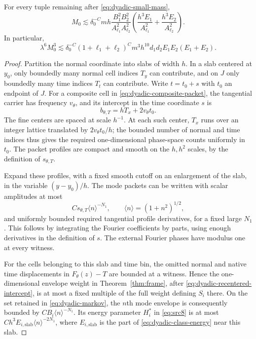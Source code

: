 \begin{lemma}\label{lem:dyadic-tuple}
For every tuple remaining after \eqref{eq:dyadic-small-mass},
\begin{equation}\label{eq:dyadic-frame-substitution}
 M_0\lesssim \delta_0^{-C}mh
 \frac{B_1^2B_2^2}{A_{\ell_1}^2A_{\ell_2}^2}
 \left(\frac{h^3E_1}{A_{\ell_1}^2}
            +\frac{h^3E_2}{A_{\ell_2}^2}\right).
\end{equation}
In particular,
\begin{equation}\label{eq:dyadic-cubic-mass}
 \lambda^6M_0^3\lesssim
 \delta_0^{-C}(1+\ell_1+\ell_2)^C
 m^3h^{10}d_1d_2E_1E_2(E_1+E_2).
\end{equation}
\end{lemma}
\begin{proof}
Partition the normal coordinate into slabs of width $h$.  In a slab
centered at $y_0$, only boundedly many normal cell indices $T_y$ can
contribute, and on $J$ only boundedly many time indices $T_t$ can
contribute.  Write $t=t_0+s$ with $t_0$ an endpoint of $J$.
For a composite cell in \eqref{eq:dyadic-composite-packet}, the
tangential carrier has frequency $v_\theta$, and its intercept in the
time coordinate $s$ is
\begin{equation}\label{eq:dyadic-recentered-intercept}
 b_{\theta,T}=hT_x+2v_\theta t_0.
\end{equation}
The fine centers are spaced at scale $h^{-1}$.  At each such center,
$T_x$ runs over an integer lattice translated by $2v_\theta t_0/h$;
the bounded number of normal and time indices thus gives the required
one-dimensional phase-space counts uniformly in $t_0$.  The packet
profiles are compact and smooth on the $h,h^2$ scales, by the definition
of $s_{\theta,T}$.

Expand these profiles, with a fixed smooth cutoff on an enlargement of
the slab, in the variable $(y-y_0)/h$.  The mode packets can be written
with scalar amplitudes at most
\[
 C s_{\theta,T}\langle n\rangle^{-N_1},
 \qquad \langle n\rangle=(1+n^2)^{1/2},
\]
and uniformly bounded required tangential profile derivatives, for a
fixed large $N_1$.  This follows by integrating the Fourier coefficients
by parts, using enough derivatives in the definition of $s$.  The
external Fourier phases have modulus one at every witness.

For the cells belonging to this slab and time bin, the omitted normal
and native time displacements in $F_\theta(z)-T$ are bounded at a
witness.  Hence the one-dimensional envelope weight in
Theorem~\ref{thm:frame}, after \eqref{eq:dyadic-recentered-intercept},
is at most a fixed multiple of the full weight defining $S_i$ there.
On the set retained in \eqref{eq:dyadic-markov}, the $n$th mode
envelope is consequently bounded by
$CB_i\langle n\rangle^{-N_1}$.  Its energy parameter $H_i^*$ in
\eqref{eq:src8} is at most
$Ch^3E_{i,\mathrm{slab}}\langle n\rangle^{-2N_1}$, where
$E_{i,\mathrm{slab}}$ is the part of \eqref{eq:dyadic-class-energy}
near this slab.


\end{proof}
